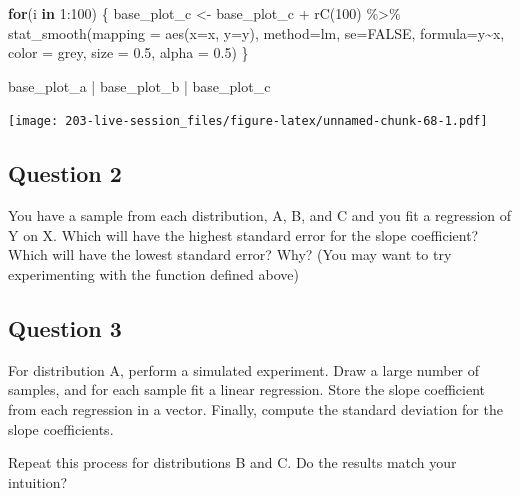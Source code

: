 \documentclass[
]{book}
\newenvironment{Shaded}{\begin{snugshade}}{\end{snugshade}}
\newcommand{\AttributeTok}[1]{\textcolor[rgb]{0.77,0.63,0.00}{#1}}
\newcommand{\ConstantTok}[1]{\textcolor[rgb]{0.00,0.00,0.00}{#1}}
\newcommand{\ControlFlowTok}[1]{\textcolor[rgb]{0.13,0.29,0.53}{\textbf{#1}}}
\newcommand{\DecValTok}[1]{\textcolor[rgb]{0.00,0.00,0.81}{#1}}
\newcommand{\FloatTok}[1]{\textcolor[rgb]{0.00,0.00,0.81}{#1}}
\newcommand{\FunctionTok}[1]{\textcolor[rgb]{0.00,0.00,0.00}{#1}}
\newcommand{\NormalTok}[1]{#1}
\newcommand{\OtherTok}[1]{\textcolor[rgb]{0.56,0.35,0.01}{#1}}
\newcommand{\SpecialCharTok}[1]{\textcolor[rgb]{0.00,0.00,0.00}{#1}}
\newcommand{\StringTok}[1]{\textcolor[rgb]{0.31,0.60,0.02}{#1}}
\theoremstyle{definition}
\theoremstyle{definition}
\theoremstyle{definition}
\theoremstyle{definition}
\theoremstyle{remark}
\begin{document}
\begin{Shaded}
\begin{Highlighting}[]
\ControlFlowTok{for}\NormalTok{(i }\ControlFlowTok{in} \DecValTok{1}\SpecialCharTok{:}\DecValTok{100}\NormalTok{) \{ }
\NormalTok{    base\_plot\_c }\OtherTok{\textless{}{-}}\NormalTok{ base\_plot\_c }\SpecialCharTok{+} \FunctionTok{rC}\NormalTok{(}\DecValTok{100}\NormalTok{) }\SpecialCharTok{\%\textgreater{}\%} 
      \FunctionTok{stat\_smooth}\NormalTok{(}\AttributeTok{mapping =} \FunctionTok{aes}\NormalTok{(}\AttributeTok{x=}\NormalTok{x, }\AttributeTok{y=}\NormalTok{y), }\AttributeTok{method=}\StringTok{\textquotesingle{}lm\textquotesingle{}}\NormalTok{, }\AttributeTok{se=}\ConstantTok{FALSE}\NormalTok{, }\AttributeTok{formula=}\StringTok{\textquotesingle{}y\textasciitilde{}x\textquotesingle{}}\NormalTok{, }\AttributeTok{color =} \StringTok{\textquotesingle{}grey\textquotesingle{}}\NormalTok{, }\AttributeTok{size =} \FloatTok{0.5}\NormalTok{, }\AttributeTok{alpha =} \FloatTok{0.5}\NormalTok{)}
\NormalTok{\}}



\NormalTok{base\_plot\_a }\SpecialCharTok{|}\NormalTok{ base\_plot\_b  }\SpecialCharTok{|}\NormalTok{ base\_plot\_c}
\end{Highlighting}
\end{Shaded}

\texttt{[image: 203-live-session\_files/figure-latex/unnamed-chunk-68-1.pdf]}

\hypertarget{question-2}{%
\subsection{Question 2}\label{question-2}}

You have a sample from each distribution, A, B, and C and you fit a regression of Y on X. Which will have the highest standard error for the slope coefficient? Which will have the lowest standard error? Why? (You may want to try experimenting with the function defined above)

\hypertarget{question-3}{%
\subsection{Question 3}\label{question-3}}

For distribution A, perform a simulated experiment. Draw a large number of samples, and for each sample fit a linear regression. Store the slope coefficient from each regression in a vector. Finally, compute the standard deviation for the slope coefficients.

Repeat this process for distributions B and C. Do the results match your intuition?
\end{document}
